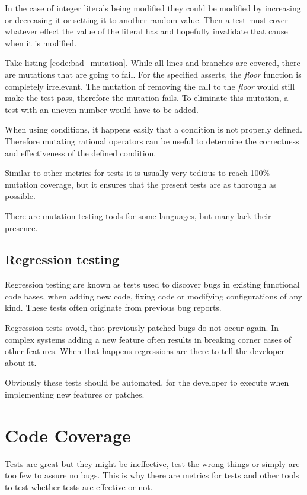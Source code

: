 In the case of integer literals being modified they could be modified by
increasing or decreasing it or setting it to another random value. Then a test
must cover whatever effect the value of the literal has and hopefully
invalidate that cause when it is modified.

Take listing \ref{code:bad_mutation}. While all lines and branches are covered,
there are mutations that are going to fail. For the specified asserts, the
\textit{floor} function is completely irrelevant. The mutation of removing the
call to the \textit{floor} would still make the test pass, therefore the
mutation fails. To eliminate this mutation, a test with an uneven number would
have to be added.

When using conditions, it happens easily that a condition is not properly
defined. Therefore mutating rational operators can be useful to determine the
correctness and effectiveness of the defined condition.

Similar to other metrics for tests it is usually very tedious to reach 100\%
mutation coverage, but it ensures that the present tests are as thorough as
possible.

There are mutation testing tools for some languages, but many lack their
presence.

\cite{mutation_testing}

\subsection{Regression testing}

Regression testing are known as tests used to discover bugs in existing
functional code bases, when adding new code, fixing code or modifying
configurations of any kind. These tests often originate from previous bug
reports.

Regression tests avoid, that previously patched bugs do not occur again. In
complex systems adding a new feature often results in breaking corner cases of
other features. When that happens regressions are there to tell the developer
about it.

Obviously these tests should be automated, for the developer to execute when
implementing new features or patches.

\section{Code Coverage}

Tests are great but they might be ineffective, test the wrong things
or simply are too few to assure no bugs. This is why there are metrics
for tests and other tools to test whether tests are effective or not.

